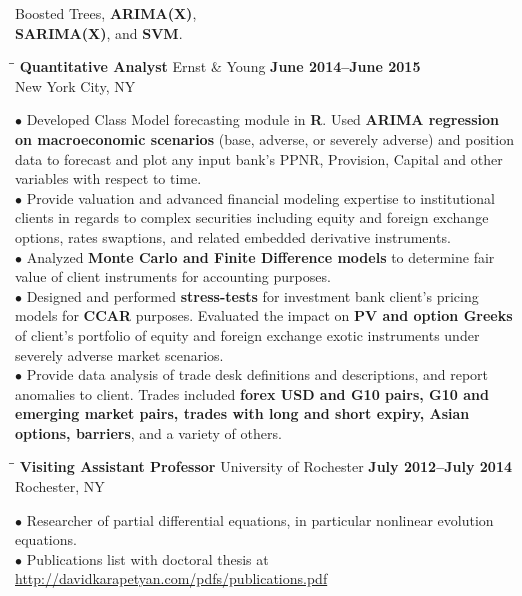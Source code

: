 \documentclass{resume}
\begin{document}
\begin{resume}
{Boosted Trees}, \textbf{ARIMA(X)}, \\ \textbf{SARIMA(X)}, and \textbf{SVM}. 
\begin{tabbing}
\hspace{2.3in}\= \hspace{2.6in}\= \kill
{\bf Quantitative Analyst} \> Ernst \& Young   
\>\textbf{June 2014--June 2015 } \\
    \>New York City, NY 
\end{tabbing}
$\bullet$
Developed Class Model forecasting module in \textbf{R}. Used
\textbf{ARIMA regression \\ on macroeconomic scenarios} (base, adverse, or severely adverse) and position data to forecast and plot any input bank’s PPNR,
Provision, Capital and other variables with respect to time.  \\
$\bullet$ Provide valuation and advanced financial modeling expertise to
institutional clients in regards to complex securities including equity and
foreign exchange options, rates swaptions, and related embedded derivative
instruments.  \\
$\bullet$ 
Analyzed \textbf{Monte Carlo and Finite Difference models} to determine fair value of
client instruments for accounting purposes.  \\
$\bullet$ Designed and performed \textbf{stress-tests} for investment bank
client’s pricing models for \textbf{CCAR} purposes. Evaluated the impact on
\textbf{PV and option Greeks} of client’s portfolio of equity and foreign exchange exotic instruments under severely adverse market scenarios. 
\\
$\bullet$
Provide data analysis of trade desk definitions and descriptions, and report
anomalies to client. Trades included \textbf{forex USD and G10 pairs, G10 and
	emerging market pairs, trades with long and short expiry, Asian options,
barriers}, and a variety of others.
\begin{tabbing}
\hspace{2.3in}\= \hspace{2.6in}\= \kill
{\bf Visiting Assistant Professor} \>University of Rochester     
\>\textbf{July 2012--July 2014} \\
    \>Rochester, NY 
\end{tabbing}
$\bullet$ Researcher of partial differential equations, in particular nonlinear evolution equations.  
\\
$\bullet$ Publications list with doctoral thesis at \url{http://davidkarapetyan.com/pdfs/publications.pdf}
\\

\end{resume}
\end{document}
